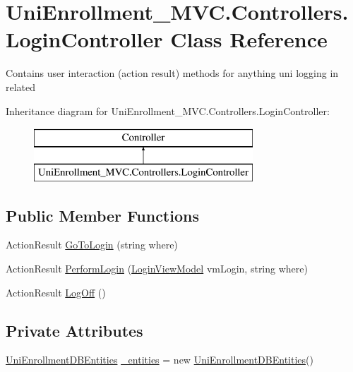 \hypertarget{class_uni_enrollment___m_v_c_1_1_controllers_1_1_login_controller}{}\section{Uni\+Enrollment\+\_\+\+M\+V\+C.\+Controllers.\+Login\+Controller Class Reference}
\label{class_uni_enrollment___m_v_c_1_1_controllers_1_1_login_controller}


Contains user interaction (action result) methods for anything uni \textquotesingle{}logging in\textquotesingle{} related  


Inheritance diagram for Uni\+Enrollment\+\_\+\+M\+V\+C.\+Controllers.\+Login\+Controller\+:\begin{figure}[H]
\begin{center}
\leavevmode
\includegraphics[height=2.000000cm]{class_uni_enrollment___m_v_c_1_1_controllers_1_1_login_controller}
\end{center}
\end{figure}
\subsection*{Public Member Functions}
\begin{DoxyCompactItemize}
\item 
Action\+Result \hyperlink{class_uni_enrollment___m_v_c_1_1_controllers_1_1_login_controller_aee5f81236c19135abeabc3f23c7a5c60}{Go\+To\+Login} (string where)
\item 
Action\+Result \hyperlink{class_uni_enrollment___m_v_c_1_1_controllers_1_1_login_controller_affee63e1f64b80feb35ad1e507174e9a}{Perform\+Login} (\hyperlink{class_uni_enrollment___m_v_c_1_1_models_1_1_login_view_model}{Login\+View\+Model} vm\+Login, string where)
\item 
Action\+Result \hyperlink{class_uni_enrollment___m_v_c_1_1_controllers_1_1_login_controller_ac1c1d9102078847d0a6d75e10cea087a}{Log\+Off} ()
\end{DoxyCompactItemize}
\subsection*{Private Attributes}
\begin{DoxyCompactItemize}
\item 
\hyperlink{class_uni_enrollment___m_v_c_1_1_models_1_1_uni_enrollment_d_b_entities}{Uni\+Enrollment\+D\+B\+Entities} \hyperlink{class_uni_enrollment___m_v_c_1_1_controllers_1_1_login_controller_a68efde44e582f061cc104372638ad5e6}{\+\_\+entities} = new \hyperlink{class_uni_enrollment___m_v_c_1_1_models_1_1_uni_enrollment_d_b_entities}{Uni\+Enrollment\+D\+B\+Entities}()
\end{DoxyCompactItemize}


